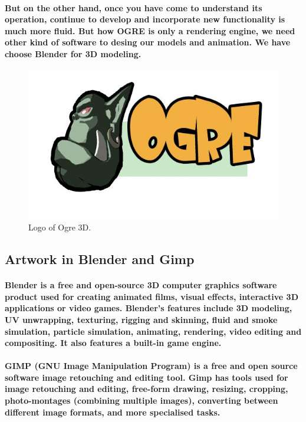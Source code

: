\documentclass[a4paper,10pt]{article}
\newcommand{\p}[1]{\paragraph{\indent\textnormal{#1}}}
\begin{document}
    \p{But on the other hand, once you have come to understand its operation, continue to develop and incorporate new functionality is much more fluid. But how OGRE is only a rendering engine, we need other kind of software to desing our models and animation. We have choose Blender for 3D modeling.}

	\begin{figure}[hbt]
	    \begin{center}
		\includegraphics[scale=.4]{ogrelogo.jpg}
	    \end{center}
	    \caption{Logo of Ogre 3D.}
	\end{figure}

  \subsection{Artwork in Blender and Gimp}

    \p{\textbf{Blender} is a free and open-source 3D computer graphics software product used for creating animated films, visual effects, interactive 3D applications or video games. Blender's features include 3D modeling, UV unwrapping, texturing, rigging and skinning, fluid and smoke simulation, particle simulation, animating, rendering, video editing and compositing. It also features a built-in game engine.}

    \p{\textbf{GIMP} (GNU Image Manipulation Program) is a free and open source software image retouching and editing tool. Gimp has tools used for image retouching and editing, free-form drawing, resizing, cropping, photo-montages (combining multiple images), converting between different image formats, and more specialised tasks. }
\end{document}
